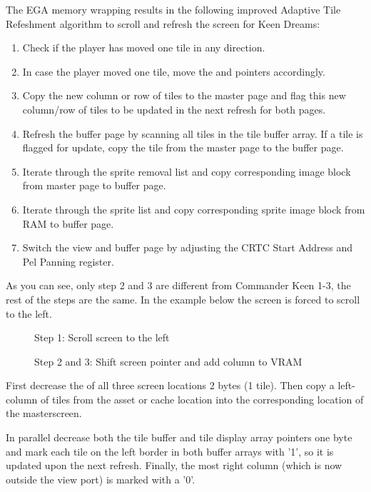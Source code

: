 \documentclass[book.tex]{subfiles}
\begin{document}
The EGA memory wrapping results in the following improved Adaptive Tile Refeshment algorithm to scroll and refresh the screen for Keen Dreams:
\begin{enumerate}
\item Check if the player has moved one tile in any direction.
\item In case the player moved one tile, move the  and  pointers accordingly. 
\item Copy the new column or row of tiles to the master page and flag this new column/row of tiles to be updated in the next refresh for both pages. 
\item Refresh the buffer page by scanning all tiles in the tile buffer array. If a tile is flagged for update, copy the tile from the master page to the buffer page.
\item Iterate through the sprite removal list and copy corresponding image block from master page to buffer page. 
\item Iterate through the sprite list and copy corresponding sprite image block from RAM to buffer page.
\item Switch the view and buffer page by adjusting the CRTC Start Address and Pel Panning register.
\end{enumerate}

As you can see, only step 2 and 3 are different from Commander Keen 1-3, the rest of the steps are the same.
In the example below the screen is forced to scroll to the left.
\\

\begin{figure}[H]
\centering
 \caption{Step 1: Scroll screen to the left}
 \label{fig:kc4_6_start}
\end{figure}

\begin{figure}[H]
\centering
 \caption{Step 2 and 3: Shift screen pointer and add column to VRAM}
 \label{fig:kc4_6_add_column}
\end{figure}


First decrease the  of all three screen locations 2 bytes (1 tile). Then copy a left-column of tiles from the asset or cache location into the corresponding location of the masterscreen.\\
\par
In parallel decrease both the tile buffer and tile display array pointers one byte and mark each tile on the left border in both buffer arrays with '1', so it is updated upon the next refresh.
Finally, the most right column (which is now outside the view port) is marked with a '0'.
\end{document}
